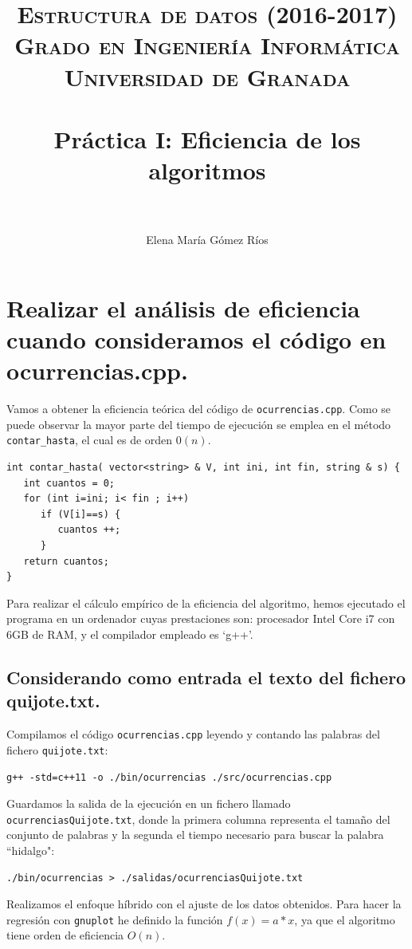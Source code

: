 \documentclass[11pt]{article}
\title{	
	\normalfont \normalsize 
	\textsc{\textbf{Estructura de datos (2016-2017)} \\ Grado en Ingeniería Informática \\ Universidad de Granada} \\ [25pt] 
	\horrule{0.5pt} \\[0.4cm]
	\huge Práctica I: Eficiencia de los algoritmos \\ 
	\horrule{2pt} \\[0.5cm] 
}
\author{Elena María Gómez Ríos}
\begin{document}
\maketitle
\thispagestyle{empty}

\newpage
\tableofcontents
\thispagestyle{empty}
\newpage


\section{Realizar el análisis de eficiencia cuando consideramos el código en ocurrencias.cpp.}

Vamos a obtener la eficiencia teórica del código de \texttt{ocurrencias.cpp}. Como se puede observar la mayor parte del tiempo de ejecución se emplea en el método \texttt{contar\_hasta}, el cual es de orden $0(n)$.
\begin{verbatim}
int contar_hasta( vector<string> & V, int ini, int fin, string & s) {
   int cuantos = 0;
   for (int i=ini; i< fin ; i++)
      if (V[i]==s) {
         cuantos ++;
      }
   return cuantos;
}
\end{verbatim}

Para realizar el cálculo empírico de la eficiencia del algoritmo, hemos ejecutado el programa en un ordenador cuyas prestaciones son: procesador Intel Core i7 con 6GB de RAM, y el compilador empleado es `g++'.\\

\subsection{Considerando como entrada el texto del fichero quijote.txt.}

Compilamos el código \texttt{ocurrencias.cpp} leyendo y contando las palabras del fichero \texttt{quijote.txt}:
\begin{verbatim}
g++ -std=c++11 -o ./bin/ocurrencias ./src/ocurrencias.cpp
\end{verbatim}

Guardamos la salida de la ejecución en un fichero llamado \texttt{ocurrenciasQuijote.txt}, donde la primera columna representa el tamaño del conjunto de palabras y la segunda el tiempo necesario para buscar la palabra ``hidalgo":
\begin{verbatim}
./bin/ocurrencias > ./salidas/ocurrenciasQuijote.txt
\end{verbatim}

Realizamos el enfoque híbrido con el ajuste de los datos obtenidos. Para hacer la regresión con \texttt{gnuplot} he definido la función $f(x) = a * x$, ya que el algoritmo tiene orden de eficiencia $O(n)$.
\end{document}
